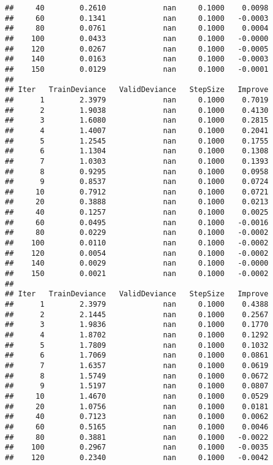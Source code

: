 \documentclass[]{article}
\begin{document}
\begin{verbatim}
##     40        0.2610             nan     0.1000    0.0098
##     60        0.1341             nan     0.1000   -0.0003
##     80        0.0761             nan     0.1000    0.0004
##    100        0.0433             nan     0.1000   -0.0000
##    120        0.0267             nan     0.1000   -0.0005
##    140        0.0163             nan     0.1000   -0.0003
##    150        0.0129             nan     0.1000   -0.0001
## 
## Iter   TrainDeviance   ValidDeviance   StepSize   Improve
##      1        2.3979             nan     0.1000    0.7019
##      2        1.9038             nan     0.1000    0.4130
##      3        1.6080             nan     0.1000    0.2815
##      4        1.4007             nan     0.1000    0.2041
##      5        1.2545             nan     0.1000    0.1755
##      6        1.1304             nan     0.1000    0.1308
##      7        1.0303             nan     0.1000    0.1393
##      8        0.9295             nan     0.1000    0.0958
##      9        0.8537             nan     0.1000    0.0724
##     10        0.7912             nan     0.1000    0.0721
##     20        0.3888             nan     0.1000    0.0213
##     40        0.1257             nan     0.1000    0.0025
##     60        0.0495             nan     0.1000   -0.0016
##     80        0.0229             nan     0.1000   -0.0002
##    100        0.0110             nan     0.1000   -0.0002
##    120        0.0054             nan     0.1000   -0.0002
##    140        0.0029             nan     0.1000   -0.0000
##    150        0.0021             nan     0.1000   -0.0002
## 
## Iter   TrainDeviance   ValidDeviance   StepSize   Improve
##      1        2.3979             nan     0.1000    0.4388
##      2        2.1445             nan     0.1000    0.2567
##      3        1.9836             nan     0.1000    0.1770
##      4        1.8702             nan     0.1000    0.1292
##      5        1.7809             nan     0.1000    0.1032
##      6        1.7069             nan     0.1000    0.0861
##      7        1.6357             nan     0.1000    0.0619
##      8        1.5749             nan     0.1000    0.0672
##      9        1.5197             nan     0.1000    0.0807
##     10        1.4670             nan     0.1000    0.0529
##     20        1.0756             nan     0.1000    0.0181
##     40        0.7123             nan     0.1000    0.0062
##     60        0.5165             nan     0.1000    0.0046
##     80        0.3881             nan     0.1000   -0.0022
##    100        0.2967             nan     0.1000   -0.0035
##    120        0.2340             nan     0.1000   -0.0042

\end{verbatim}
\end{document}
